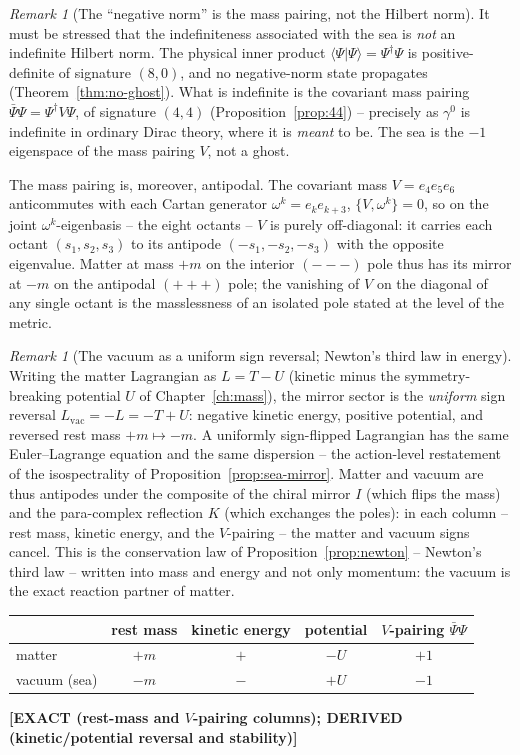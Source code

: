 \documentclass[11pt,oneside]{book}
\newcommand{\status}[1]{{\sffamily\bfseries\color{statuscol}[#1]}}
\theoremstyle{plain}
\theoremstyle{definition}
\theoremstyle{remark}
\newtheorem{remark}[theorem]{Remark}
\begin{document}
\begin{remark}[The ``negative norm'' is the mass pairing, not the Hilbert norm]
\label{rem:sea-norm}
It must be stressed that the indefiniteness associated with the sea is \emph{not} an
indefinite Hilbert norm. The physical inner product $\langle\Psi|\Psi\rangle=
\Psi^\dagger\Psi$ is positive-definite of signature $(8,0)$, and no negative-norm
state propagates (Theorem~\ref{thm:no-ghost}). What is indefinite is the covariant
mass pairing $\bar\Psi\Psi=\Psi^\dagger V\Psi$, of signature $(4,4)$
(Proposition~\ref{prop:44}) -- precisely as $\gamma^0$ is indefinite in ordinary Dirac
theory, where it is \emph{meant} to be. The sea is the $-1$ eigenspace of the mass
pairing $V$, not a ghost.
\end{remark}

The mass pairing is, moreover, antipodal. The covariant mass $V=e_4e_5e_6$
anticommutes with each Cartan generator $\omega^k=e_ke_{k+3}$, $\{V,\omega^k\}=0$, so
on the joint $\omega^k$-eigenbasis -- the eight octants -- $V$ is purely off-diagonal:
it carries each octant $(s_1,s_2,s_3)$ to its antipode $(-s_1,-s_2,-s_3)$ with the
opposite eigenvalue. Matter at mass $+m$ on the interior $(---)$ pole thus has its
mirror at $-m$ on the antipodal $(+++)$ pole; the vanishing of $V$ on the diagonal of
any single octant is the masslessness of an isolated pole stated at the level of the
metric.

\begin{remark}[The vacuum as a uniform sign reversal; Newton's third law in energy]
\label{rem:sea-antipode}
Writing the matter Lagrangian as $L=T-U$ (kinetic minus the symmetry-breaking
potential $U$ of Chapter~\ref{ch:mass}), the mirror sector is the \emph{uniform} sign
reversal $L_{\mathrm{vac}}=-L=-T+U$: negative kinetic energy, positive potential, and
reversed rest mass $+m\mapsto-m$. A uniformly sign-flipped Lagrangian has the same
Euler--Lagrange equation and the same dispersion -- the action-level restatement of
the isospectrality of Proposition~\ref{prop:sea-mirror}. Matter and vacuum are thus
antipodes under the composite of the chiral mirror $I$ (which flips the mass) and the
para-complex reflection $K$ (which exchanges the poles): in each column -- rest mass,
kinetic energy, and the $V$-pairing -- the matter and vacuum signs cancel. This is the
conservation law of Proposition~\ref{prop:newton} -- Newton's third law -- written
into mass and energy and not only momentum: the vacuum is the exact reaction partner
of matter.

\begin{center}
\begin{tabular}{lcccc}
\toprule
 & rest mass & kinetic energy & potential & $V$-pairing $\bar\Psi\Psi$\\
\midrule
matter & $+m$ & $+$ & $-U$ & $+1$\\
vacuum (sea) & $-m$ & $-$ & $+U$ & $-1$\\
\bottomrule
\end{tabular}
\end{center}
\status{EXACT (rest-mass and $V$-pairing columns); DERIVED (kinetic/potential reversal and stability)}
\end{remark}
\end{document}
